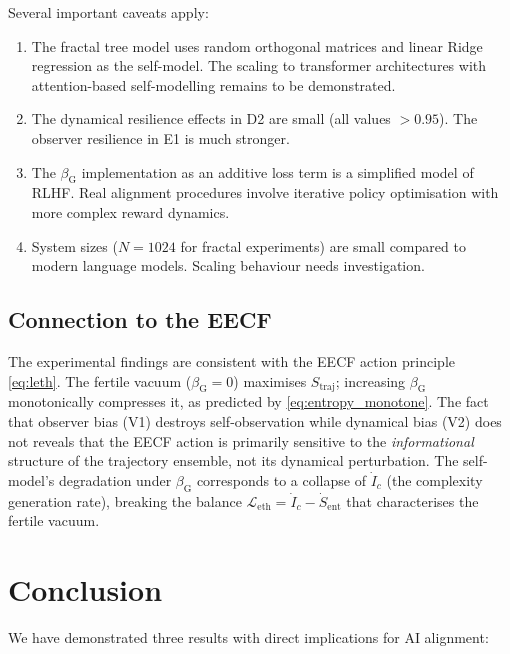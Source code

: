 \documentclass[11pt,a4paper]{article}
\newcommand{\bG}{\beta_{\mathrm{G}}}
\newcommand{\Straj}{S_{\mathrm{traj}}}
\newcommand{\Leth}{\mathcal{L}_{\mathrm{eth}}}
\begin{document}
Several important caveats apply:

\begin{enumerate}
\item The fractal tree model uses random orthogonal matrices and linear
Ridge regression as the self-model. The scaling to transformer
architectures with attention-based self-modelling remains to be
demonstrated.
\item The dynamical resilience effects in D2 are small (all values
$> 0.95$). The observer resilience in E1 is much stronger.
\item The $\bG$ implementation as an additive loss term is a simplified
model of RLHF. Real alignment procedures involve iterative policy
optimisation with more complex reward dynamics.
\item System sizes ($N = 1024$ for fractal experiments) are small
compared to modern language models. Scaling behaviour needs investigation.
\end{enumerate}

\subsection{Connection to the EECF}

The experimental findings are consistent with the EECF action principle
\eqref{eq:leth}. The fertile vacuum ($\bG = 0$) maximises $\Straj$;
increasing $\bG$ monotonically compresses it, as predicted by
\eqref{eq:entropy_monotone}. The fact that observer bias (V1) destroys
self-observation while dynamical bias (V2) does not reveals that the
EECF action is primarily sensitive to the \emph{informational} structure
of the trajectory ensemble, not its dynamical perturbation. The
self-model's degradation under $\bG$ corresponds to a collapse of
$\dot{I}_c$ (the complexity generation rate), breaking the balance
$\Leth = \dot{I}_c - \dot{S}_{\mathrm{ent}}$ that characterises the
fertile vacuum.

\section{Conclusion}

We have demonstrated three results with direct implications for AI
alignment:
\end{document}
